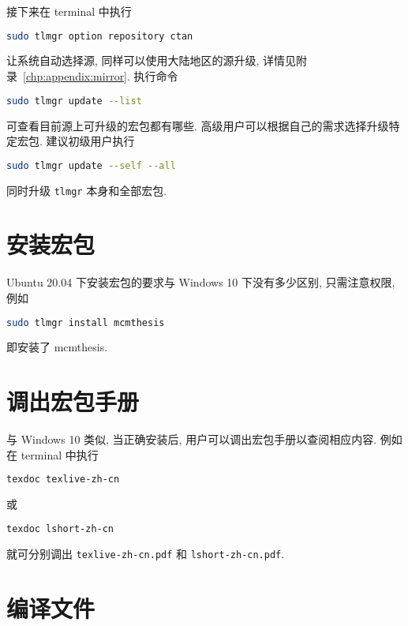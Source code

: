 接下来在 \textsf{terminal} 中执行
\begin{lstlisting}[language = bash]
  sudo tlmgr option repository ctan
\end{lstlisting}
让系统自动选择源,
同样可以使用大陆地区的源升级,
详情见附录~\ref{chp:appendix:mirror}.
执行命令
\begin{lstlisting}[language = bash]
  sudo tlmgr update --list
\end{lstlisting}
可查看目前源上可升级的宏包都有哪些. 
高级用户可以根据自己的需求选择升级特定宏包.
建议初级用户执行
\begin{lstlisting}[language = bash]
  sudo tlmgr update --self --all
\end{lstlisting}
同时升级 \texttt{tlmgr} 本身和全部宏包. 

\section{安装宏包}\label{sec:ubuntu:installpackage}

Ubuntu 20.04 下安装宏包的要求与 Windows 10 下没有多少区别, 只需注意权限, 例如
\begin{lstlisting}[language = bash]
  sudo tlmgr install mcmthesis
\end{lstlisting}
即安装了 mcmthesis.

\section{调出宏包手册}\label{sec:ubuntu:texdoc}

与 Windows 10 类似,
当正确安装后,
用户可以调出宏包手册以查阅相应内容.
例如在 \textsf{terminal} 中执行
\begin{lstlisting}[language=bash]
  texdoc texlive-zh-cn
\end{lstlisting}
或
\begin{lstlisting}[language=bash]
  texdoc lshort-zh-cn
\end{lstlisting}
就可分别调出 \texttt{texlive-zh-cn.pdf} 和 \texttt{lshort-zh-cn.pdf}.

\section{编译文件}

